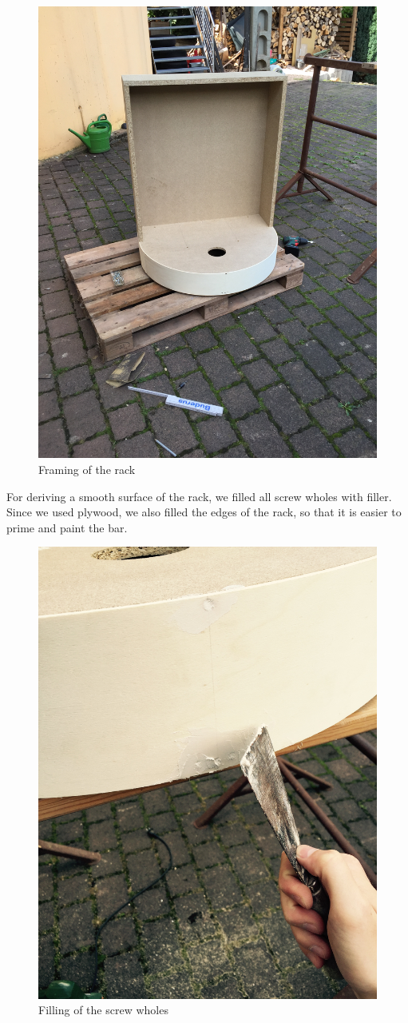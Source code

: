 \documentclass{acm_proc_article-sp}
\begin{document}
\begin{figure}[htbp] 
  \centering
     \includegraphics[width=0.6\linewidth, angle =270]{pictures/rack2.jpg}
  \caption{Framing of the rack}
  \label{fig:framing}
\end{figure}

For deriving a smooth surface of the rack, we filled all screw wholes with filler. Since we used plywood, we also filled the edges of the rack, so that it is easier to prime and paint the bar. 

\begin{figure}[htbp]  
  \centering
     \includegraphics[width=0.5\linewidth]{pictures/filling.jpg}
  \caption{Filling of the screw wholes}
  \label{fig:filling}
\end{figure}
\end{document}
